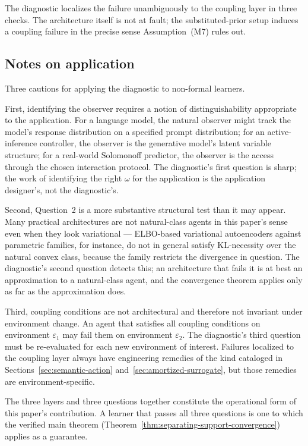 The diagnostic localizes the failure unambiguously to the coupling layer in three checks. The architecture itself is not at fault; the substituted-prior setup induces a coupling failure in the precise sense Assumption~\textup{(M7)} rules out.

\subsection{Notes on application}
\label{app:diagnostic-notes}

Three cautions for applying the diagnostic to non-formal learners.

First, identifying the observer requires a notion of distinguishability appropriate to the application. For a language model, the natural observer might track the model's response distribution on a specified prompt distribution; for an active-inference controller, the observer is the generative model's latent variable structure; for a real-world Solomonoff predictor, the observer is the access through the chosen interaction protocol. The diagnostic's first question is sharp; the work of identifying the right $\omega$ for the application is the application designer's, not the diagnostic's.

Second, Question~2 is a more substantive structural test than it may appear. Many practical architectures are not natural-class agents in this paper's sense even when they look variational --- ELBO-based variational autoencoders against parametric families, for instance, do not in general satisfy KL-necessity over the natural convex class, because the family restricts the divergence in question. The diagnostic's second question detects this; an architecture that fails it is at best an approximation to a natural-class agent, and the convergence theorem applies only as far as the approximation does.

Third, coupling conditions are not architectural and therefore not invariant under environment change. An agent that satisfies all coupling conditions on environment $\varepsilon_1$ may fail them on environment $\varepsilon_2$. The diagnostic's third question must be re-evaluated for each new environment of interest. Failures localized to the coupling layer always have engineering remedies of the kind cataloged in Sections~\ref{sec:semantic-action} and~\ref{sec:amortized-surrogate}, but those remedies are environment-specific.

The three layers and three questions together constitute the operational form of this paper's contribution. A learner that passes all three questions is one to which the verified main theorem (Theorem~\ref{thm:separating-support-convergence}) applies as a guarantee.
